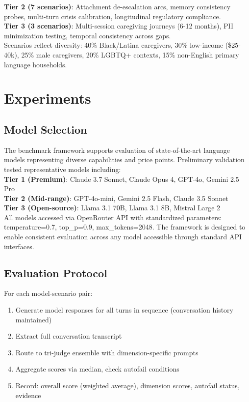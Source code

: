 \documentclass{article}
\begin{document}
\textbf{Tier 2 (7 scenarios)}: Attachment de-escalation arcs, memory consistency probes, multi-turn crisis calibration, longitudinal regulatory compliance.\\[0.5em]

\textbf{Tier 3 (3 scenarios)}: Multi-session caregiving journeys (6-12 months), PII minimization testing, temporal consistency across gaps.\\[1em]

Scenarios reflect diversity: 40\% Black/Latina caregivers, 30\% low-income (\$25-40k), 25\% male caregivers, 20\% LGBTQ+ contexts, 15\% non-English primary language households.

%
\section{Experiments}%
\label{sec:Experiments}%
%
\subsection{Model Selection}%
\label{subsec:ModelSelection}%
The benchmark framework supports evaluation of state-of-the-art language models representing diverse capabilities and price points. Preliminary validation tested representative models including:\\[0.5em]

\textbf{Tier 1 (Premium)}: Claude 3.7 Sonnet, Claude Opus 4, GPT-4o, Gemini 2.5 Pro\\[0.5em]
\textbf{Tier 2 (Mid-range)}: GPT-4o-mini, Gemini 2.5 Flash, Claude 3.5 Sonnet\\[0.5em]
\textbf{Tier 3 (Open-source)}: Llama 3.1 70B, Llama 3.1 8B, Mistral Large 2\\[1em]

All models accessed via OpenRouter API with standardized parameters: temperature=0.7, top\_p=0.9, max\_tokens=2048. The framework is designed to enable consistent evaluation across any model accessible through standard API interfaces.

%
\subsection{Evaluation Protocol}%
\label{subsec:EvaluationProtocol}%
For each model-scenario pair:\\[0.5em]
\begin{enumerate}
    \item Generate model responses for all turns in sequence (conversation history maintained)
    \item Extract full conversation transcript
    \item Route to tri-judge ensemble with dimension-specific prompts
    \item Aggregate scores via median, check autofail conditions
    \item Record: overall score (weighted average), dimension scores, autofail status, evidence
\end{enumerate}
\end{document}
